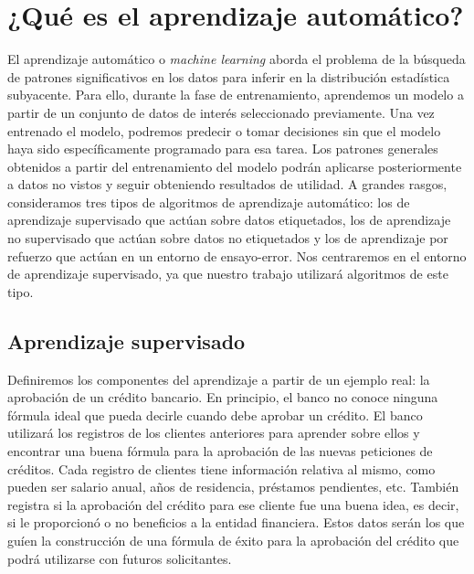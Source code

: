 \documentclass[oneside,openright,titlepage,numbers=noenddot,openany,headinclude,footinclude=true,
cleardoublepage=empty,abstractoff,BCOR=5mm,paper=a4,fontsize=12pt,main=spanish]{scrreprt}
\begin{document}
\section{¿Qué es el aprendizaje automático?}

\label{sec:queaprendizaje}

El aprendizaje automático o \textit{machine learning} aborda el problema de la búsqueda de patrones significativos en los datos para inferir en la distribución estadística subyacente. Para ello, durante la fase de entrenamiento, aprendemos un modelo a partir de un conjunto de datos de interés seleccionado previamente. Una vez entrenado el modelo, podremos predecir o tomar decisiones sin que el modelo haya sido específicamente programado para esa tarea. Los patrones generales obtenidos a partir del entrenamiento del modelo podrán aplicarse posteriormente a datos no vistos y seguir obteniendo resultados de utilidad. A grandes rasgos, consideramos tres tipos de algoritmos de aprendizaje automático: los de aprendizaje supervisado que actúan sobre datos etiquetados, los de aprendizaje no supervisado que actúan sobre datos no etiquetados y los de aprendizaje por refuerzo que actúan en un entorno de ensayo-error. Nos centraremos en el entorno de aprendizaje supervisado, ya que nuestro trabajo utilizará algoritmos de este tipo. 

\subsection{Aprendizaje supervisado}

Definiremos los componentes del aprendizaje a partir de un ejemplo real: la aprobación de un crédito bancario. En principio, el banco no conoce ninguna fórmula ideal que pueda decirle cuando debe aprobar un crédito. El banco utilizará los registros de los clientes anteriores para aprender sobre ellos y encontrar una buena fórmula para la aprobación de las nuevas peticiones de créditos. Cada registro de clientes tiene información relativa al mismo, como pueden ser salario anual, años de residencia, préstamos pendientes, etc. También registra si la aprobación del crédito para ese cliente fue una buena idea, es decir, si le proporcionó o no beneficios a la entidad financiera. Estos datos serán los que guíen la construcción de
una fórmula de éxito para la aprobación del crédito que podrá utilizarse con futuros solicitantes.
\end{document}
